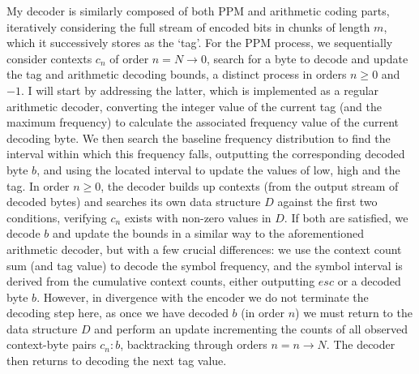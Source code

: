 \documentclass[a4paper, 11pt]{article}
\begin{document}
My decoder is similarly composed of both PPM and arithmetic coding parts, iteratively considering the full stream of encoded bits in chunks of length $m$, which it successively stores as the `tag'. For the PPM process, we sequentially consider contexts $c_{n}$ of order $n = N \to 0$, search for a byte to decode and update the tag and arithmetic decoding bounds, a distinct process in orders $n \geq 0$ and $-1$. I will start by addressing the latter, which is implemented as a regular arithmetic decoder, converting the integer value of the current tag (and the maximum frequency) to calculate the associated frequency value of the current decoding byte. We then search the baseline frequency distribution to find the interval within which this frequency falls, outputting the corresponding decoded byte $b$, and using the located interval to update the values of low, high and the tag. In order $n \geq 0$, the decoder builds up contexts (from the output stream of decoded bytes) and searches its own data structure $D$ against the first two conditions, verifying $c_{n}$ exists with non-zero values in $D$. If both are satisfied, we decode $b$ and update the bounds in a similar way to the aforementioned arithmetic decoder, but with a few crucial differences: we use the context count sum (and tag value) to decode the symbol frequency, and the symbol interval is derived from the cumulative context counts, either outputting $esc$ or a decoded byte $b$. However, in divergence with the encoder we do not terminate the decoding step here, as once we have decoded $b$ (in order $n$) we must return to the data structure $D$ and perform an update incrementing the counts of all observed context-byte pairs $c_{n} \colon b$, backtracking through orders $n = n \to N$. The decoder then returns to decoding the next tag value.
\end{document}
